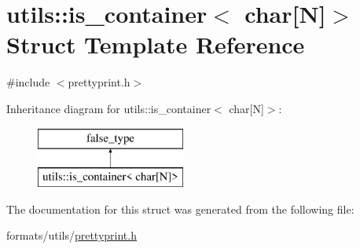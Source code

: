 \hypertarget{structutils_1_1is__container_3_01char[_n]_4}{}\section{utils\+::is\+\_\+container$<$ char\mbox{[}N\mbox{]}$>$ Struct Template Reference}
\label{structutils_1_1is__container_3_01char[_n]_4}


{\ttfamily \#include $<$prettyprint.\+h$>$}

Inheritance diagram for utils\+::is\+\_\+container$<$ char\mbox{[}N\mbox{]}$>$\+:\begin{figure}[H]
\begin{center}
\leavevmode
\includegraphics[height=2.000000cm]{d0/da6/structutils_1_1is__container_3_01char[_n]_4}
\end{center}
\end{figure}


The documentation for this struct was generated from the following file\+:\begin{DoxyCompactItemize}
\item 
formats/utils/\mbox{\hyperlink{prettyprint_8h}{prettyprint.\+h}}\end{DoxyCompactItemize}

